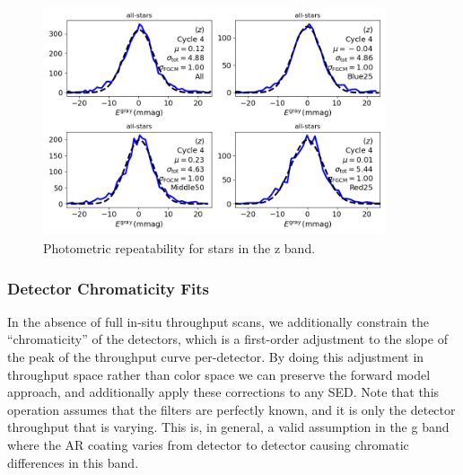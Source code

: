 \begin{figure}
  \begin{center}
    \includegraphics[width=0.9\textwidth]{photometric_calibration_figures/repeatability_z.png}
  \end{center}
  \caption{Photometric repeatability for stars in the z band.}
\end{figure}

\subsubsection{Detector Chromaticity Fits}

In the absence of full in-situ throughput scans, we additionally constrain the
``chromaticity'' of the detectors, which is a first-order adjustment to the
slope of the peak of the throughput curve per-detector.  By doing this
adjustment in throughput space rather than color space we can preserve the
forward model approach, and additionally apply these corrections to any
SED. Note that this operation assumes that the filters are perfectly known, and
it is only the detector throughput that is varying.  This is, in general, a
valid assumption in the g band where the AR coating varies from detector to
detector causing chromatic differences in this band.

